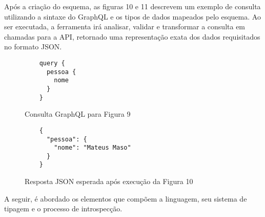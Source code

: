 Após a criação do esquema, as figuras 10 e 11 descrevem um exemplo de consulta utilizando a sintaxe do GraphQL e os tipos de dados mapeados pelo esquema. Ao ser executada, a ferramenta irá analisar, validar e transformar a consulta em chamadas para a API, retornado uma representação exata dos dados requisitados no formato JSON. \cite{Facebook2016}

\begin{figure}[H]
  \centering
  \begin{verbatim}
    query {
      pessoa {
        nome
      }
    }
  \end{verbatim}
  \caption{Consulta GraphQL para Figura 9}
\end{figure}

\begin{figure}[H]
  \centering
  \begin{verbatim}
    {
      "pessoa": {
        "nome": "Mateus Maso"
      }
    }
  \end{verbatim}
  \caption{Resposta JSON esperada após execução da Figura 10}
\end{figure}

A seguir, é abordado os elementos que compõem a linguagem, seu sistema de tipagem e o processo de introspecção.




